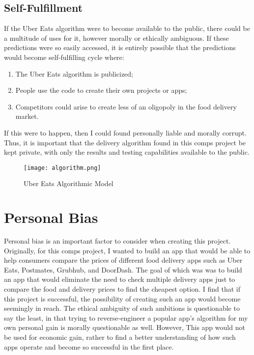 \documentclass[10pt,twocolumn]{article}
\begin{document}
\subsection{Self-Fulfillment}

If the Uber Eats algorithm were to become available to the public, there could be a multitude of uses for it, however morally or ethically ambiguous. If these predictions were so easily accessed, it is entirely possible that the predictions would become self-fulfilling cycle where:

\begin{enumerate}
    \item The Uber Eats algorithm is publicized;
    \item People use the code to create their own projects or apps;
    \item Competitors could arise to create less of an oligopoly in the food delivery market.
\end{enumerate}

If this were to happen, then I could found personally liable and morally corrupt. Thus, it is important that the delivery algorithm found in this comps project be kept private, with only the results and testing capabilities available to the public.

\begin{figure}
    \centering
    \texttt{[image: algorithm.png]}
    \caption{
       Uber Eats Algorithmic Model
    }
    \label{fig:second-page}
\end{figure}

\section{Personal Bias}

Personal bias is an important factor to consider when creating this project. Originally, for this comps project, I wanted to build an app that would be able to help consumers compare the prices of different food delivery apps such as Uber Eats, Postmates, Grubhub, and DoorDash. The goal of which was was to build an app that would eliminate the need to check multiple delivery apps just to compare the food and delivery prices to find the cheapest option. I find that if this project is successful, the possibility of creating such an app would become seemingly in reach. The ethical ambiguity of such ambitions is questionable to say the least, in that trying to reverse-engineer a popular app's algorithm for my own personal gain is morally questionable as well. However, This app would not be used for economic gain, rather to find a better understanding of how such apps operate and become so successful in the first place.
\end{document}
